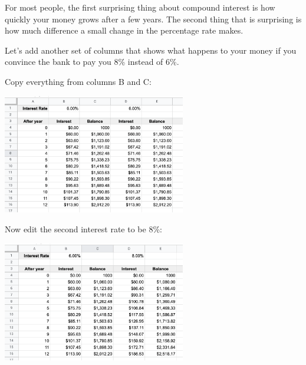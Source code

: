 For most people, the first surprising thing about compound interest is
how quickly your money grows after a few years.  The second thing that
is surprising is how much difference a small change in the percentage
rate makes.

Let's add another set of columns that shows what happens to your money
if you convince the bank to pay you 8\% instead of 6\%.

Copy everything from columns B and C:

\includegraphics[width=0.6\textwidth]{CopyForSecondInterest.png}

Now edit the second interest rate to be 8\%:

\includegraphics[width=0.6\textwidth]{AtBiggerInterestRate.png}

